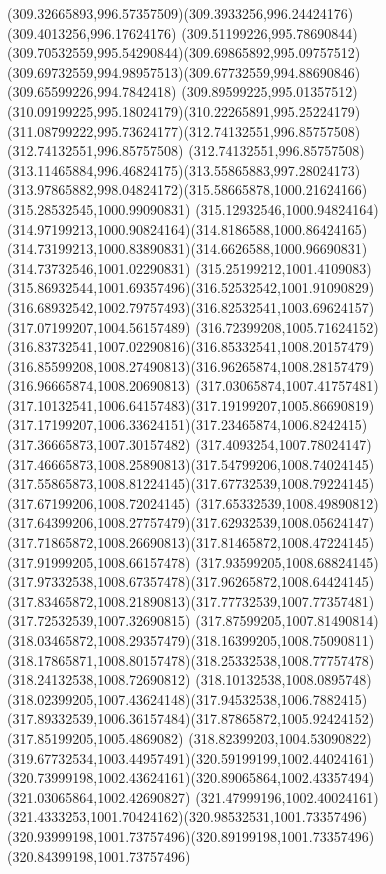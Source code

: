{{\curveto(309.32665893,996.57357509)(309.3933256,996.24424176)(309.4013256,996.17624176)
\curveto(309.51199226,995.78690844)(309.70532559,995.54290844)(309.69865892,995.09757512)
\curveto(309.69732559,994.98957513)(309.67732559,994.88690846)(309.65599226,994.7842418)
\curveto(309.89599225,995.01357512)(310.09199225,995.18024179)(310.22265891,995.25224179)
\curveto(311.08799222,995.73624177)(312.74132551,996.85757508)(312.74132551,996.85757508)
\curveto(312.74132551,996.85757508)(313.11465884,996.46824175)(313.55865883,997.28024173)
\curveto(313.97865882,998.04824172)(315.58665878,1000.21624166)(315.28532545,1000.99090831)
\curveto(315.12932546,1000.94824164)(314.97199213,1000.90824164)(314.8186588,1000.86424165)
\curveto(314.73199213,1000.83890831)(314.6626588,1000.96690831)(314.73732546,1001.02290831)
\curveto(315.25199212,1001.4109083)(315.86932544,1001.69357496)(316.52532542,1001.91090829)
\curveto(316.68932542,1002.79757493)(316.82532541,1003.69624157)(317.07199207,1004.56157489)
\curveto(316.72399208,1005.71624152)(316.83732541,1007.02290816)(316.85332541,1008.20157479)
\curveto(316.85599208,1008.27490813)(316.96265874,1008.28157479)(316.96665874,1008.20690813)
\curveto(317.03065874,1007.41757481)(317.10132541,1006.64157483)(317.19199207,1005.86690819)
\curveto(317.17199207,1006.33624151)(317.23465874,1006.8242415)(317.36665873,1007.30157482)
\curveto(317.4093254,1007.78024147)(317.46665873,1008.25890813)(317.54799206,1008.74024145)
\curveto(317.55865873,1008.81224145)(317.67732539,1008.79224145)(317.67199206,1008.72024145)
\curveto(317.65332539,1008.49890812)(317.64399206,1008.27757479)(317.62932539,1008.05624147)
\curveto(317.71865872,1008.26690813)(317.81465872,1008.47224145)(317.91999205,1008.66157478)
\curveto(317.93599205,1008.68824145)(317.97332538,1008.67357478)(317.96265872,1008.64424145)
\curveto(317.83465872,1008.21890813)(317.77732539,1007.77357481)(317.72532539,1007.32690815)
\curveto(317.87599205,1007.81490814)(318.03465872,1008.29357479)(318.16399205,1008.75090811)
\curveto(318.17865871,1008.80157478)(318.25332538,1008.77757478)(318.24132538,1008.72690812)
\curveto(318.10132538,1008.0895748)(318.02399205,1007.43624148)(317.94532538,1006.7882415)
\curveto(317.89332539,1006.36157484)(317.87865872,1005.92424152)(317.85199205,1005.4869082)
\curveto(318.82399203,1004.53090822)(319.67732534,1003.44957491)(320.59199199,1002.44024161)
\curveto(320.73999198,1002.43624161)(320.89065864,1002.43357494)(321.03065864,1002.42690827)
\curveto(321.47999196,1002.40024161)(321.4333253,1001.70424162)(320.98532531,1001.73357496)
\curveto(320.93999198,1001.73757496)(320.89199198,1001.73357496)(320.84399198,1001.73757496)
}}
